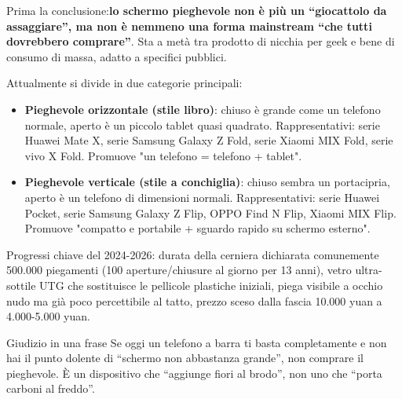 


Prima la conclusione:\textbf{lo schermo pieghevole non è più un “giocattolo da assaggiare”, ma non è nemmeno una forma mainstream “che tutti dovrebbero comprare”}. Sta a metà tra prodotto di nicchia per geek e bene di consumo di massa, adatto a specifici pubblici.

Attualmente si divide in due categorie principali:

\begin{itemize}
  \item \textbf{Pieghevole orizzontale (stile libro)}: chiuso è grande come un telefono normale, aperto è un piccolo tablet quasi quadrato. Rappresentativi: serie Huawei Mate X, serie Samsung Galaxy Z Fold, serie Xiaomi MIX Fold, serie vivo X Fold. Promuove "un telefono = telefono + tablet".
  \item \textbf{Pieghevole verticale (stile a conchiglia)}: chiuso sembra un portacipria, aperto è un telefono di dimensioni normali. Rappresentativi: serie Huawei Pocket, serie Samsung Galaxy Z Flip, OPPO Find N Flip, Xiaomi MIX Flip. Promuove "compatto e portabile + sguardo rapido su schermo esterno".
\end{itemize}

Progressi chiave del 2024-2026: durata della cerniera dichiarata comunemente 500.000 piegamenti (100 aperture/chiusure al giorno per 13 anni), vetro ultra-sottile UTG che sostituisce le pellicole plastiche iniziali, piega visibile a occhio nudo ma già poco percettibile al tatto, prezzo sceso dalla fascia 10.000 yuan a 4.000-5.000 yuan.

\begin{tcbinfo}{Giudizio in una frase}
Se oggi un telefono a barra ti basta completamente e non hai il punto dolente di “schermo non abbastanza grande”, non comprare il pieghevole. È un dispositivo che “aggiunge fiori al brodo”, non uno che “porta carboni al freddo”.

\end{tcbinfo}


